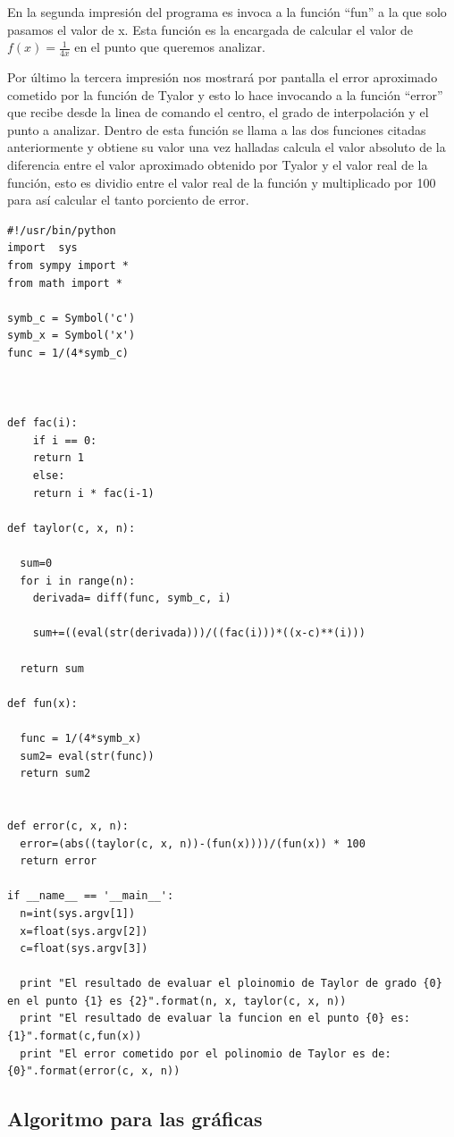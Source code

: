 \documentclass[a4paper,12pt]{article}
\begin{document}
En la segunda impresión del programa es invoca a la función ``fun'' a la que solo pasamos el valor de x. Esta función es la encargada de calcular 
el valor de $f(x)=\frac{1}{4x}$ en el punto que queremos analizar.
  
Por último la tercera impresión nos mostrará por pantalla el error aproximado cometido por la función de Tyalor y esto lo hace invocando a la función ``error'' que recibe
desde la linea de comando el centro, el grado de interpolación y el punto a analizar. Dentro de esta función se llama a las dos funciones citadas anteriormente y obtiene su valor
una vez halladas calcula el valor absoluto de la diferencia entre el valor aproximado obtenido por Tyalor y el valor real de la función, esto es dividio entre el valor real
de la función y multiplicado por 100 para así calcular el tanto porciento de error. 


\begin{verbatim}
#!/usr/bin/python
import  sys
from sympy import *
from math import *

symb_c = Symbol('c')
symb_x = Symbol('x')
func = 1/(4*symb_c)



def fac(i):
    if i == 0:
	return 1
    else:
	return i * fac(i-1)
	
def taylor(c, x, n):
  
  sum=0
  for i in range(n):
    derivada= diff(func, symb_c, i)

    sum+=((eval(str(derivada)))/((fac(i)))*((x-c)**(i)))
    
  return sum
  
def fun(x):
  
  func = 1/(4*symb_x)
  sum2= eval(str(func))
  return sum2
  
  
def error(c, x, n):
  error=(abs((taylor(c, x, n))-(fun(x))))/(fun(x)) * 100
  return error
    
if __name__ == '__main__':
  n=int(sys.argv[1])
  x=float(sys.argv[2])
  c=float(sys.argv[3])
    
  print "El resultado de evaluar el ploinomio de Taylor de grado {0} en el punto {1} es {2}".format(n, x, taylor(c, x, n))
  print "El resultado de evaluar la funcion en el punto {0} es: {1}".format(c,fun(x))
  print "El error cometido por el polinomio de Taylor es de: {0}".format(error(c, x, n))
\end{verbatim}
\subsection{Algoritmo para las gráficas}
\end{document}
